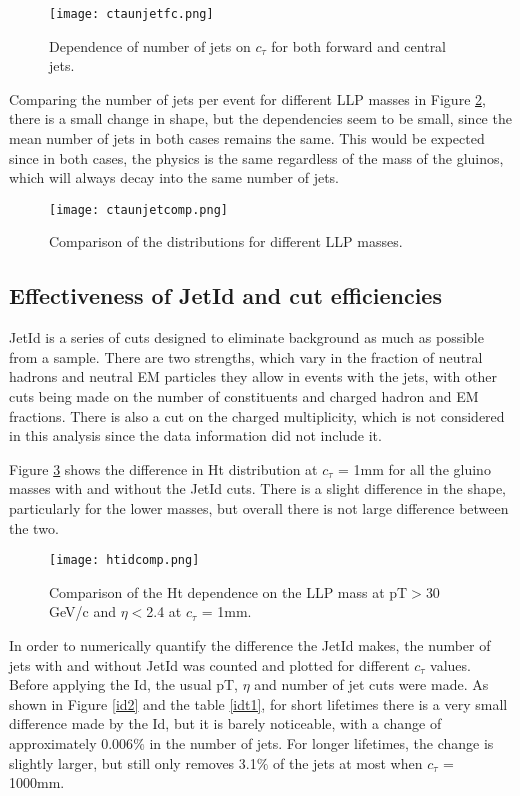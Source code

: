 \documentclass{article}
\begin{document}
\begin{figure}[H]
\centering
\texttt{[image: ctaunjetfc.png]}
\caption{Dependence of number of jets on $c_{\tau}$ for both forward and central jets.}
	\label{njet4}
\end{figure}

Comparing the number of jets per event for different LLP masses in Figure \ref{njet5}, there is a small change in shape, but the dependencies seem to be small, since the mean number of jets in both cases remains the same. This would be expected since in both cases, the physics is the same regardless of the mass of the gluinos, which will always decay into the same number of jets.

\begin{figure}[H]
\centering
\texttt{[image: ctaunjetcomp.png]}
\caption{Comparison of the distributions for different LLP masses.}
	\label{njet5}
\end{figure}

\subsection*{Effectiveness of JetId and cut efficiencies}

JetId is a series of cuts designed to eliminate background as much as possible from a sample. There are two strengths, which vary in the fraction of neutral hadrons and neutral EM particles they allow in events with the jets, with other cuts being made on the number of constituents and charged hadron and EM fractions. There is also a cut on the charged multiplicity, which is not considered in this analysis since the data information did not include it.  

Figure \ref{id1} shows the difference in Ht distribution at $c_{\tau}$ = 1mm for all the gluino masses with and without the JetId cuts. There is a slight difference in the shape, particularly for the lower masses, but overall there is not large difference between the two. 

\begin{figure}[H]
\centering
\texttt{[image: htidcomp.png]}
\caption{Comparison of the Ht dependence on the LLP mass at pT$>$30 GeV/c and $\eta < $2.4 at $c_{\tau}$ = 1mm.}
	\label{id1}
\end{figure}

In order to numerically quantify the difference the JetId makes, the number of jets with and without JetId was counted and plotted for different $c_{\tau}$ values. Before applying the Id, the usual pT, $\eta$ and number of jet cuts were made. As shown in Figure \ref{id2} and the table \ref{idt1}, for short lifetimes there is a very small difference made by the Id, but it is barely noticeable, with a change of approximately 0.006$\%$ in the number of jets. For longer lifetimes, the change is slightly larger, but still only removes 3.1$\%$ of the jets at most when $c_{\tau}$ = 1000mm. 
\end{document}
